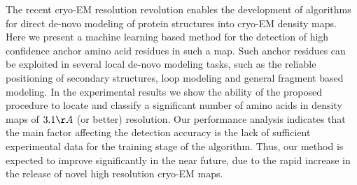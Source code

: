 The recent cryo-EM resolution revolution enables the development of algorithms for 
direct de-novo modeling of protein structures into cryo-EM density maps. 
Here we present a machine learning based method for the detection of 
high confidence anchor amino acid residues in such a map. Such anchor residues
can be exploited in several local de-novo modeling tasks, such as the reliable positioning of secondary
structures, loop modeling and general fragment based modeling.
In the experimental results we show the ability of the proposed procedure
to locate and classify a significant number of amino acids in 
density maps of $3.1 \AA$ (or better) resolution. 
Our performance analysis indicates that the main factor affecting the detection accuracy is the 
lack of sufficient experimental data for the training stage of the algorithm.
Thus, our method is expected to improve significantly in the near future, due to the 
rapid increase in the release of novel high resolution cryo-EM maps.